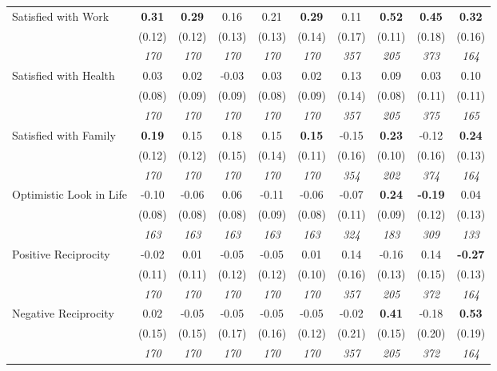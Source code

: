 \begin{tabular}{l c c c c c c c c c}
Satisfied with Work & \textbf{ 0.31 } & \textbf{ 0.29 } & 0.16 & 0.21 & \textbf{0.29} & 0.11 & \textbf{0.52} & \textbf{ 0.45 } & \textbf{0.32} \\
& (0.12) & (0.12) & (0.13) & (0.13) & (0.14) & (0.17) & (0.11) & (0.18) & (0.16) \\
& \textit{ 170 } & \textit{ 170 } & \textit{ 170 } & \textit{ 170 } & \textit{ 170 } & \textit{ 357 } & \textit{ 205 } & \textit{ 373 } & \textit{ 164 } \\
Satisfied with Health & 0.03 & 0.02 & -0.03 & 0.03 & 0.02 & 0.13 & 0.09 & 0.03 & 0.10 \\
& (0.08) & (0.09) & (0.09) & (0.08) & (0.09) & (0.14) & (0.08) & (0.11) & (0.11) \\
& \textit{ 170 } & \textit{ 170 } & \textit{ 170 } & \textit{ 170 } & \textit{ 170 } & \textit{ 357 } & \textit{ 205 } & \textit{ 375 } & \textit{ 165 } \\
Satisfied with Family & \textbf{ 0.19 } & 0.15 & 0.18 & 0.15 & \textbf{0.15} & -0.15 & \textbf{0.23} & -0.12 & \textbf{0.24} \\
& (0.12) & (0.12) & (0.15) & (0.14) & (0.11) & (0.16) & (0.10) & (0.16) & (0.13) \\
& \textit{ 170 } & \textit{ 170 } & \textit{ 170 } & \textit{ 170 } & \textit{ 170 } & \textit{ 354 } & \textit{ 202 } & \textit{ 374 } & \textit{ 164 } \\
Optimistic Look in Life & -0.10 & -0.06 & 0.06 & -0.11 & -0.06 & -0.07 & \textbf{0.24} & \textbf{ -0.19 } & 0.04 \\
& (0.08) & (0.08) & (0.08) & (0.09) & (0.08) & (0.11) & (0.09) & (0.12) & (0.13) \\
& \textit{ 163 } & \textit{ 163 } & \textit{ 163 } & \textit{ 163 } & \textit{ 163 } & \textit{ 324 } & \textit{ 183 } & \textit{ 309 } & \textit{ 133 } \\
Positive Reciprocity & -0.02 & 0.01 & -0.05 & -0.05 & 0.01 & 0.14 & -0.16 & 0.14 & \textbf{-0.27} \\
& (0.11) & (0.11) & (0.12) & (0.12) & (0.10) & (0.16) & (0.13) & (0.15) & (0.13) \\
& \textit{ 170 } & \textit{ 170 } & \textit{ 170 } & \textit{ 170 } & \textit{ 170 } & \textit{ 357 } & \textit{ 205 } & \textit{ 372 } & \textit{ 164 } \\
Negative Reciprocity & 0.02 & -0.05 & -0.05 & -0.05 & -0.05 & -0.02 & \textbf{0.41} & -0.18 & \textbf{0.53} \\
& (0.15) & (0.15) & (0.17) & (0.16) & (0.12) & (0.21) & (0.15) & (0.20) & (0.19) \\
& \textit{ 170 } & \textit{ 170 } & \textit{ 170 } & \textit{ 170 } & \textit{ 170 } & \textit{ 357 } & \textit{ 205 } & \textit{ 372 } & \textit{ 164 } \\
\bottomrule
\end{tabular}
